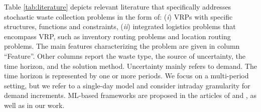\documentclass[preprint,11pt,authoryear]{elsarticle}
\begin{document}
Table \ref{tab:literature} depicts relevant literature that specifically addresses stochastic waste collection problems in the form of: (\textit{i}) VRPs with specific structures, functions and constraints,  (\textit{ii}) integrated logistics problems that encompass VRP, such as inventory routing problems and location routing problems. 
The main features characterizing the problem are given in column ``Feature''.
%
Other columns report the waste type, the source of uncertainty, the time horizon, and the solution method. 
Uncertainty mainly refers to demand. The time horizon is represented by one or more periods. We focus on a multi-period setting, but we refer to a single-day model and consider intraday granularity for demand increments. ML-based frameworks are proposed in the articles of \cite{Nguyen2025} and \cite{Liao2025}, as well as in our work.
\end{document}
